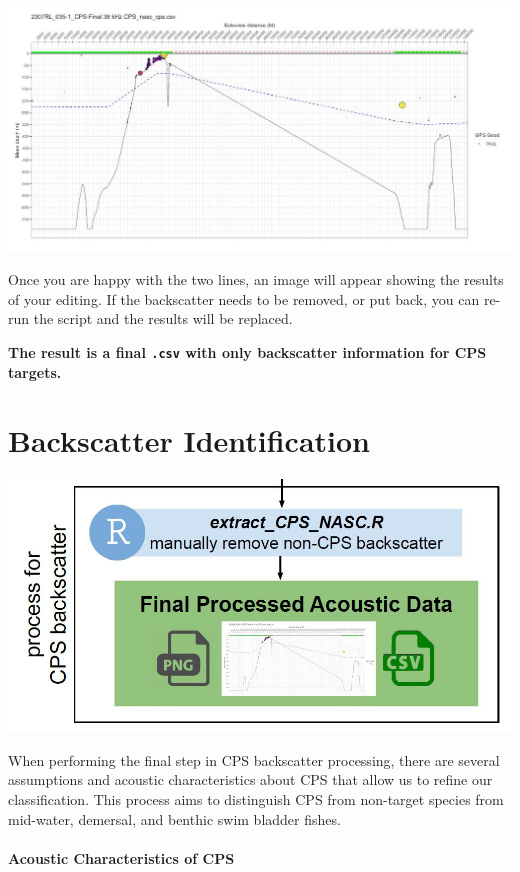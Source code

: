\documentclass[
  letterpaper,
  oneside,
  open=any]{scrbook}
\begin{document}
\includegraphics{content/images/nascr_processing_result.JPG}

Once you are happy with the two lines, an image will appear showing the
results of your editing. If the backscatter needs to be removed, or put
back, you can re-run the script and the results will be replaced.

\textbf{The result is a final \texttt{.csv} with only backscatter
information for CPS targets.}


\chapter{Backscatter Identification}\label{backscatter-identification}

\includegraphics[width=7.29167in,height=\textheight]{content/images/processing-CPS.JPG}

When performing the final step in CPS backscatter processing, there are
several assumptions and acoustic characteristics about CPS that allow us
to refine our classification. This process aims to distinguish CPS from
non-target species from mid-water, demersal, and benthic swim bladder
fishes.

\subsubsection{Acoustic Characteristics of
CPS}\label{acoustic-characteristics-of-cps}
\end{document}
